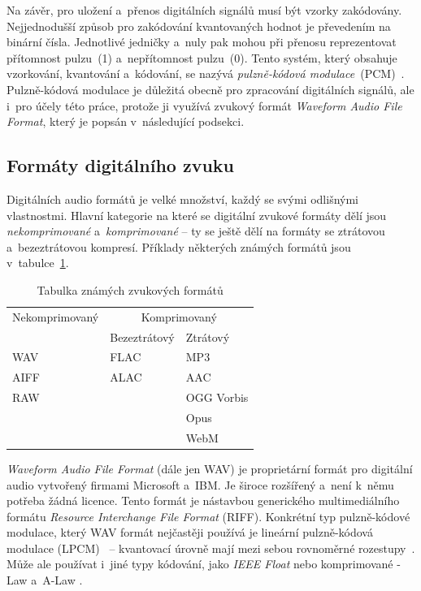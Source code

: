 Na závěr, pro uložení a~přenos digitálních signálů musí být vzorky zakódovány.
Nejjednodušší způsob pro zakódování kvantovaných hodnot je převedením na
binární čísla. Jednotlivé jedničky a~nuly pak mohou při přenosu reprezentovat
přítomnost pulzu~(1) a~nepřítomnost pulzu~(0). Tento systém, který obsahuje
vzorkování, kvantování a~kódování, se nazývá \textit{pulzně-kódová
modulace}~(PCM)~\cite{Oliver1948}. Pulzně-kódová modulace je důležitá obecně
pro zpracování digitálních signálů, ale i~pro účely této práce, protože ji
využívá zvukový formát \textit{Waveform Audio File Format}, který je popsán
v~následující podsekci.

\subsection*{Formáty digitálního zvuku}
\label{sub:digital-audio-formats}

Digitálních audio formátů je velké množství, každý se svými odlišnými
vlastnostmi. Hlavní kategorie na které se digitální zvukové formáty dělí jsou
\textit{nekomprimované} a~\textit{komprimované} -- ty se ještě dělí na formáty
se ztrátovou a~bezeztrátovou kompresí. Příklady některých známých formátů jsou
v~tabulce~\ref{tab:audio-formats}.

\begin{table}[H]
    \vskip6pt
    \caption{Tabulka známých zvukových formátů}
    \vskip6pt
    \centering
    \begin{tabular}{lll}
        \toprule
        Nekomprimovaný & \multicolumn{2}{c}{Komprimovaný} \\
        \cmidrule(r){2-3}
                       & Bezeztrátový & Ztrátový \\
        \midrule
        WAV  & FLAC & MP3 \\
        AIFF & ALAC & AAC \\
        RAW  &      & OGG Vorbis \\
             &      & Opus \\
             &      & WebM \\
        \bottomrule
    \end{tabular}
    \label{tab:audio-formats}
\end{table}

\textit{Waveform Audio File Format} (dále jen WAV) je proprietární formát pro
digitální audio vytvořený firmami Microsoft a~IBM. Je široce rozšířený a~není
k~němu potřeba žádná licence. Tento formát je nástavbou generického
multimediálního formátu \textit{Resource Interchange File Format} (RIFF).
Konkrétní typ pulzně-kódové modulace, který WAV formát nejčastěji používá je
lineární pulzně-kódová modulace (LPCM)~\cite{RFC2361} -- kvantovací úrovně mají
mezi sebou rovnoměrné rozestupy~\cite{LPCM}. Může ale používat i~jiné typy
kódování, jako \textit{IEEE Float} nebo komprimované \textmu-Law a~A-Law
\cite{RFC2361}.


